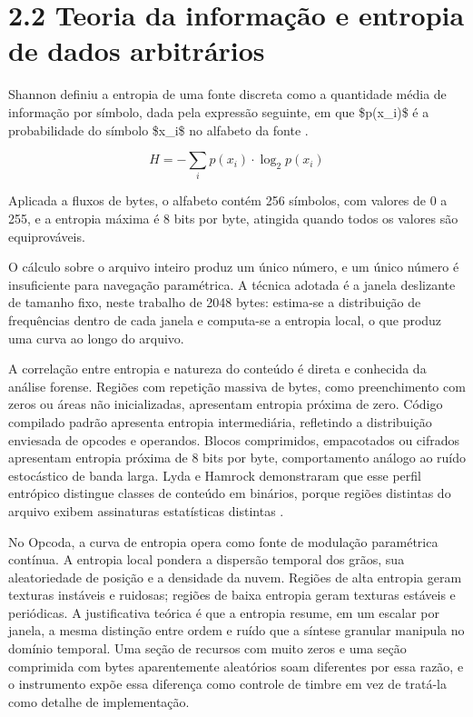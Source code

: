 \documentclass[12pt,a4paper]{article}
\begin{document}
\section*{2.2 Teoria da informação e entropia de dados arbitrários}

Shannon definiu a entropia de uma fonte discreta como a quantidade média de informação por símbolo, dada pela expressão seguinte, em que \$p(x\_i)\$ é a probabilidade do símbolo \$x\_i\$ no alfabeto da fonte \cite{shannon1948}.


\begin{equation}
H = - \sum_{i} p(x_i) \cdot \log_2 p(x_i)
\label{eq:shannon}
\end{equation}

Aplicada a fluxos de bytes, o alfabeto contém 256 símbolos, com valores de 0 a 255, e a entropia máxima é 8 bits por byte, atingida quando todos os valores são equiprováveis.


O cálculo sobre o arquivo inteiro produz um único número, e um único número é insuficiente para navegação paramétrica. A técnica adotada é a janela deslizante de tamanho fixo, neste trabalho de 2048 bytes: estima-se a distribuição de frequências dentro de cada janela e computa-se a entropia local, o que produz uma curva ao longo do arquivo.


A correlação entre entropia e natureza do conteúdo é direta e conhecida da análise forense. Regiões com repetição massiva de bytes, como preenchimento com zeros ou áreas não inicializadas, apresentam entropia próxima de zero. Código compilado padrão apresenta entropia intermediária, refletindo a distribuição enviesada de opcodes e operandos. Blocos comprimidos, empacotados ou cifrados apresentam entropia próxima de 8 bits por byte, comportamento análogo ao ruído estocástico de banda larga. Lyda e Hamrock demonstraram que esse perfil entrópico distingue classes de conteúdo em binários, porque regiões distintas do arquivo exibem assinaturas estatísticas distintas \cite{lyda2007}.


No Opcoda, a curva de entropia opera como fonte de modulação paramétrica contínua. A entropia local pondera a dispersão temporal dos grãos, sua aleatoriedade de posição e a densidade da nuvem. Regiões de alta entropia geram texturas instáveis e ruidosas; regiões de baixa entropia geram texturas estáveis e periódicas. A justificativa teórica é que a entropia resume, em um escalar por janela, a mesma distinção entre ordem e ruído que a síntese granular manipula no domínio temporal. Uma seção de recursos com muito zeros e uma seção comprimida com bytes aparentemente aleatórios soam diferentes por essa razão, e o instrumento expõe essa diferença como controle de timbre em vez de tratá-la como detalhe de implementação.
\end{document}
